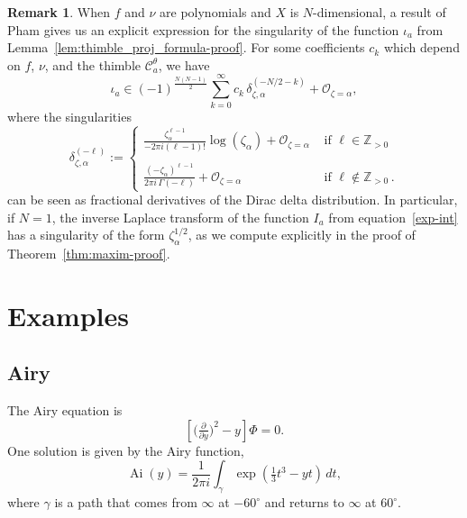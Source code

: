 \documentclass{article}
\newcommand{\Z}{\mathbb{Z}}
\DeclareMathOperator{\Ai}{Ai}
\theoremstyle{definition}
\newtheorem{remark}[definition]{Remark}
\theoremstyle{plain}
\begin{document}
\begin{remark}\label{rmk:Pham formula}
When $f$ and $\nu$ are polynomials and $X$ is $N$-dimensional, a result of Pham \cite[Equation 2.4, II partie]{pham} gives us an explicit expression for the singularity of the function $\iota_a$ from Lemma~\ref{lem:thimble_proj_formula-proof}. For some coefficients $c_k$ which depend on $f$, $\nu$, and the thimble $\mathcal{C}_a^\theta$, we have
\begin{equation}\label{eqn:Pham}
\iota_a \in (-1)^{\frac{N(N-1)}{2}}  \sum_{k=0}^\infty c_k\, \delta_{\zeta, \alpha}^{(-N/2 - k)} + \mathcal{O}_{\zeta = \alpha},
\end{equation}
where the singularities
\begin{equation*}
\delta_{\zeta,\alpha}^{(-\ell)}:=\begin{cases}
\displaystyle\frac{\zeta_\alpha^{\ell-1}}{-2\pi i(\ell-1)!}\log(\zeta_\alpha)+ \mathcal{O}_{\zeta = \alpha} & \text{ if } \ell \in \Z_{> 0}\\
& \\
\displaystyle\frac{(-\zeta_\alpha)^{\ell-1}}{2\pi i\, \Gamma(-\ell)}+ \mathcal{O}_{\zeta = \alpha} & \text{ if } \ell \notin \Z_{> 0} \,.
\end{cases}
\end{equation*}
can be seen as fractional derivatives of the Dirac delta distribution. In particular, if $N=1$, the inverse Laplace transform of the function $I_a$ from equation~\eqref{exp-int} has a singularity of the form $\zeta_\alpha^{1/2}$, as we compute explicitly in the proof of Theorem~\ref{thm:maxim-proof}. %
\end{remark}
\section{Examples}\label{sec:examples}
%
\subsection{Airy}\label{sec:airy}
%
The Airy equation is
\begin{equation}\label{eqn:airy}
\left[\big(\tfrac{\partial}{\partial y}\big)^2 - y\right] \Phi = 0.
\end{equation}
One solution is given by the Airy function,
\[ \Ai(y) = \frac{1}{2\pi i} \int_\gamma \exp\left(\tfrac{1}{3}t^3 - yt\right)\,dt, \]
where $\gamma$ is a path that comes from $\infty$ at $-60^\circ$ and returns to $\infty$ at $60^\circ$.
\end{document}

